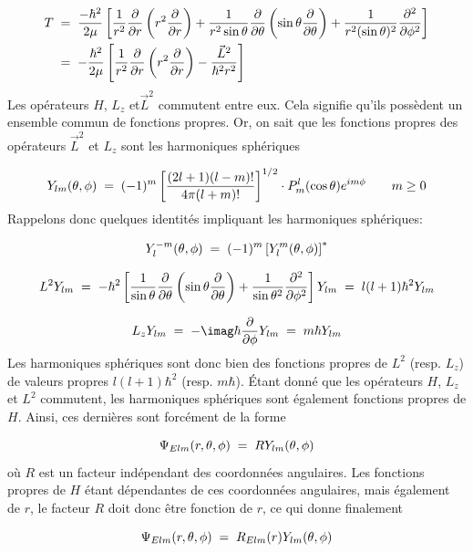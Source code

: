 \begin{align*}
    T&\; = \;
    \dfrac{-\hbar^2}{2\mu}\left[\dfrac{1}{r^2}\dfrac{\partial}{\partial r}\left(r^2\dfrac{\partial}{\partial r}\right)+\dfrac{1}{r^2\sin{\theta}}\dfrac{\partial}{\partial \theta}\left(\sin{\theta}\dfrac{\partial}{\partial \theta}\right)+\dfrac{1}{r^2(\sin{\theta})^2}\dfrac{\partial ^2}{\partial\phi^2}\right]\\
    &\; = \;-\dfrac{\hbar^2}{2\mu}\left[\dfrac{1}{r^2}\dfrac{\partial}{\partial r}\left(r^2\dfrac{\partial}{\partial r}\right)-\dfrac{\Vec{L}^2}{\hbar^2r^2}\right]
\end{align*}
Les opérateurs $H$, $L_z$ et$\Vec{L}^2$ commutent entre eux. Cela signifie qu'ils possèdent un ensemble commun de fonctions propres. Or, on sait que les fonctions propres des opérateurs $\Vec{L}^2$ et $L_z$ sont les harmoniques sphériques

\begin{align*}
    Y_{lm}(\theta, \phi) \; = \; (-1)^m \left[ \dfrac{(2l+1)(l-m)!}{4\pi(l+m)!}\right]^{1/2} \cdot P^{l}_{m}(\cos{\theta})e^{im\phi} \qquad m\ge0
\end{align*}
Rappelons donc quelques identités impliquant les harmoniques sphériques:


\[
    Y_{l}^{-m}(\theta, \phi)\; = \; (-1)^m\left[Y_{l}^{m}(\theta, \phi)\right]^{*}
\]

\[
    L^2Y_{lm}\; = \;-\hbar^2 \left[\dfrac{1}{\sin{\theta}}\dfrac{\partial}{\partial\theta}\left(\sin{\theta}\dfrac{\partial}{\partial\theta}\right)+\dfrac{1}{\sin{\theta}^2}\dfrac{\partial^2}{\partial\phi^2}\right]Y_{lm}\; = \; l(l+1)\hbar^2Y_{lm}
\]

\[
    L_zY_{lm}\eq-\imag\hbar\dfrac{\partial}{\partial\phi}Y_{lm}\eq m\hbar Y_{lm}
\]
Les harmoniques sphériques sont donc bien des fonctions propres de $L^2$ (resp. $L_z$) de valeurs propres $l(l+1)\hbar^2$ (resp. $m\hbar$). Étant donné que les opérateurs $H$, $L_z$ et $L^2$ commutent, les harmoniques sphériques sont également fonctions propres de $H$. Ainsi, ces dernières sont forcément de la forme

\[
    \Psi_{Elm}(r,\theta,\phi)\; = \; R Y_{lm}(\theta,\phi)
\]
où $R$ est un facteur indépendant des coordonnées angulaires. Les fonctions propres de $H$ étant dépendantes de ces coordonnées angulaires, mais également de $r$, le facteur $R$ doit donc être fonction de $r$, ce qui donne finalement

\begin{equation}
    \Psi_{Elm}(r,\theta,\phi)\; = \; R_{Elm}(r) Y_{lm}(\theta,\phi)
    \label{decompopsi}
\end{equation}



